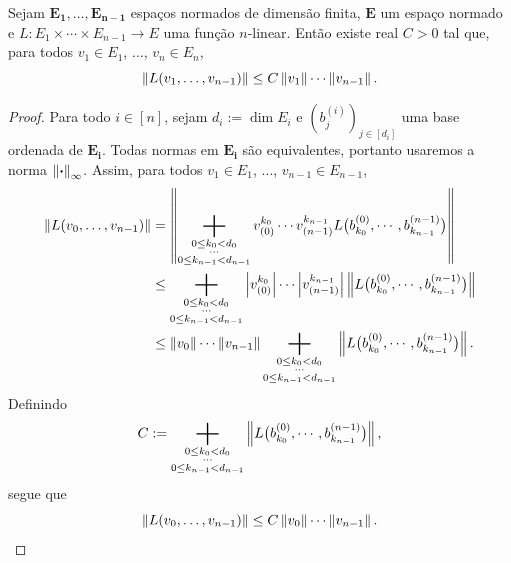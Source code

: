 \begin{prop}
Sejam $\bm{E_1},\dots,\bm{E_{n-1}}$ espaços normados de dimensão finita, $\bm{E}$ um espaço normado e $L\colon E_1 \times \cdots \times E_{n-1} \to E$ uma função $n$-linear. Então existe real $C > 0$ tal que, para todos $v_1 \in E_1$, $\ldots$, $v_n \in E_n$,
	\begin{equation*}
	\left\Vert{L(v_1,\ldots,v_{n-1})}\right\Vert \leq C\left\Vert{v_1}\right\Vert\cdots\left\Vert{v_{n-1}}\right\Vert.
	\end{equation*}
\end{prop}
\begin{proof}
Para todo $i \in [n]$, sejam $d_i := \dim E_i$ e $(b^{(i)}_j)_{j \in [d_i]}$ uma base ordenada de $\bm{E_i}$. Todas normas em $\bm{E_i}$ são equivalentes, portanto usaremos a norma $\left\Vert{\bm{\cdot}}\right\Vert_\infty$. Assim, para todos $v_1 \in E_1$, $\ldots$, $v_{n-1} \in E_{n-1}$,
	\begin{align*}
	\nor{L(v_0,\ldots,v_{n-1})} &= \nor{\sum_{\substack{0 \leq k_0 < d_0\\\cdots\\0\leq k_{n-1}< d_{n-1}}} v^{k_0}_{(0)} \cdots v^{k_{n-1}}_{(n-1)} L\big(b_{k_0}^{(0)},\cdots,b_{k_{n-1}}^{(n-1)}\big)} \\
		&\leq \sum_{\substack{0 \leq k_0 < d_0\\\cdots\\0\leq k_{n-1}< d_{n-1}}} \abs{v^{k_0}_{(0)}}\cdots\abs{v^{k_{n-1}}_{(n-1)}}\nor{L\big(b_{k_0}^{(0)},\cdots,b_{k_{n-1}}^{(n-1)}\big)} \\
		&\leq \nor{v_0}\cdots\nor{v_{n-1}}\sum_{\substack{0 \leq k_0 < d_0\\\cdots\\0\leq k_{n-1}< d_{n-1}}} \nor{L\big(b_{k_0}^{(0)},\cdots,b_{k_{n-1}}^{(n-1)}\big)}.
	\end{align*}
Definindo
	\begin{equation*}
	C := \sum_{\substack{0 \leq k_0 < d_0\\\cdots\\0\leq k_{n-1}< d_{n-1}}} \nor{L\big(b_{k_0}^{(0)},\cdots,b_{k_{n-1}}^{(n-1)}\big)},
	\end{equation*}
segue que
	\begin{equation*}
	\left\Vert{L(v_0,\ldots,v_{n-1})}\right\Vert \leq C \left\Vert{v_0}\right\Vert\cdots\left\Vert{v_{n-1}}\right\Vert.
	\end{equation*}
\end{proof}










